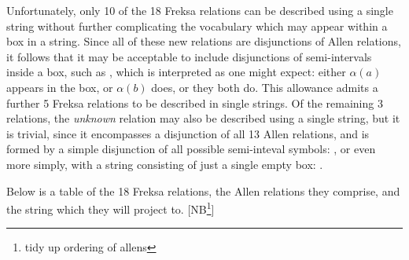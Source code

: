 \documentclass[a4paper,12pt,leqno]{article}
\newcommand{\vph}[1]{\vphantom{#1}}
\newcommand{\ebox}[1]{\fbox{$\vph{'(),}#1$}}
\newcommand{\selfnote}[1]{{\color{red}[NB\footnote{{\color{red}#1}}]}}
\newcommand{\nb}{\selfnote}
\begin{document}
Unfortunately, only 10 of the 18 Freksa relations can be described using a single string without further complicating the vocabulary which may appear within a box in a string. Since all of these new relations are disjunctions of Allen relations, it follows that it may be acceptable to include disjunctions of semi-intervals inside a box, such as \ebox{\alpha(a) \lor \alpha(b)}, which is interpreted as one might expect: either $\alpha(a)$ appears in the box, or $\alpha(b)$ does, or they both do. This allowance admits a further 5 Freksa relations to be described in single strings. Of the remaining 3 relations, the \textit{unknown} relation may also be described using a single string, but it is trivial, since it encompasses a disjunction of all 13 Allen relations, and is formed by a simple disjunction of all possible semi-inteval symbols: \ebox{\alpha(a) \lor \alpha(b) \lor \omega(a) \lor \omega(b) \lor \epsilon}, or even more simply, with a string consisting of just a single empty box: \ebox{}.

Below is a table of the 18 Freksa relations, the Allen relations they comprise, and the string which they will project to. \nb{tidy up ordering of allens}
\end{document}
